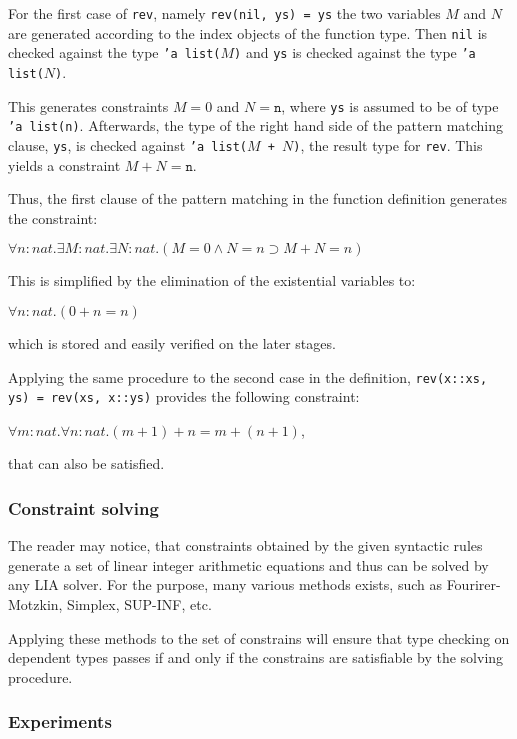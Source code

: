 \documentclass[a4paper,UKenglish]{lipics-v2016}
\begin{document}
For the first case of \texttt{rev}, namely \texttt{rev(nil, ys) = ys} the two
variables $M$ and $N$ are generated according to the index objects of the
function type.  Then \texttt{nil} is checked against the type \texttt{'a
list($M$)} and \texttt{ys} is checked against the type \texttt{'a list($N$)}.

This generates constraints $M = 0$ and $N = \texttt{n}$, where \texttt{ys} is
assumed to be of type \texttt{'a list(n)}. Afterwards, the type of the right
hand side of the pattern matching clause, \texttt{ys}, is checked against
\texttt{'a list($M$ + $N$)}, the result type for \texttt{rev}. This yields a
constraint $M + N = \texttt{n}$.

Thus, the first clause of the pattern matching in the function definition
generates the constraint:

$\forall n : nat. \exists M : nat. \exists N : nat. (M = 0 \land N = n \supset M + N = n)$

This is simplified by the elimination of the existential variables to:

$\forall n : nat. (0 + n = n)$

which is stored and easily verified on the later stages.

Applying the same procedure to the second case in the definition,
\texttt{rev(x::xs, ys) = rev(xs, x::ys)} provides the following constraint:

$\forall m : nat. \forall n : nat.(m + 1) + n = m + (n + 1)$,

that can also be satisfied.

\subsubsection{Constraint solving}

The reader may notice, that constraints obtained by the given syntactic rules
generate a set of linear integer arithmetic equations and thus can be solved by
any LIA solver. For the purpose, many various methods exists, such as
Fourirer-Motzkin, Simplex, SUP-INF, etc.

Applying these methods to the set of constrains will ensure that type checking
on dependent types passes if and only if the constrains are satisfiable by the
solving procedure.

\subsubsection{Experiments}
\end{document}

